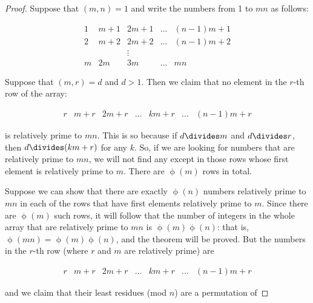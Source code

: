 \documentclass{article}
\theoremstyle{definition} %
\theoremstyle{definition}
\theoremstyle{definition}
\newcommand{\tot}{\upphi}
\theoremstyle{definition}
\begin{document}
  \begin{proof}
    Suppose that $(m, n) = 1$ and write the numbers from 1 to $mn$ as follows:
    
    \begin{equation*}
    \begin{matrix}
      1 & m + 1 & 2m + 1 & \dots & (n-1)m + 1 \\
      2 & m + 2 & 2m + 2 & \dots & (n-1)m + 2 \\
         &           &  \vdots         &           \\
      m & 2m & 3m & \dots & mn
    \end{matrix}
    \end{equation*}
    
    Suppose that $(m, r) = d$ and $d > 1$. Then we claim that no element in
    the $r$-th row of the array:
    
    \begin{equation*}
    \begin{matrix}
      r & m + r & 2m + r & \dots & km + r  & \dots & (n-1)m + r
    \end{matrix}
    \end{equation*}
    
    is relatively prime to $mn$. This is so because if $d \divides m$ and
    $d \divides r$, then $d \divides (km + r)$ for any $k$. So, if we are looking
    for numbers that are relatively prime to $mn$, we will not find any except
    in those rows whose first element is relatively prime to $m$. There are
    $\tot(m)$ rows in total.
    
    Suppose we can show that there are exactly $\tot(n)$ numbers relatively
    prime to $mn$ in each of the rows that have first elements relatively prime
    to $m$. Since there are $\tot(m)$ such rows, it will follow that the number
    of integers in the whole array that are relatively prime to $mn$ is
    $\tot(m)\tot(n)$: that is, $\tot(mn) = \tot(m)\tot(n)$, and the theorem will
    be proved. But the numbers in the $r$-th row (where $r$ and $m$ are
    relatively prime) are
    
    \begin{equation}
    \begin{matrix}
      r & m + r & 2m + r & \dots & km + r  & \dots & (n-1)m + r
    \end{matrix}
    \end{equation}
    
    and we claim that their least residues (mod $n$) are a permutation of
    

\end{proof}
\end{document}
